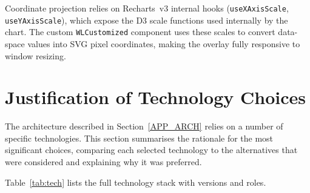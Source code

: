 Coordinate projection relies on Recharts~v3 internal hooks
(\texttt{useXAxisScale}, \texttt{useYAxisScale}), which expose the D3 scale
functions used internally by the chart. The custom \texttt{WLCustomized}
component uses these scales to convert data-space values into SVG pixel
coordinates, making the overlay fully responsive to window resizing.


\section{Justification of Technology Choices}\label{APP_TECH}

The architecture described in Section~\ref{APP_ARCH} relies on a number of
specific technologies. This section summarises the rationale for the most
significant choices, comparing each selected technology to the alternatives
that were considered and explaining why it was preferred.

Table~\ref{tab:tech} lists the full technology stack with versions and roles.

